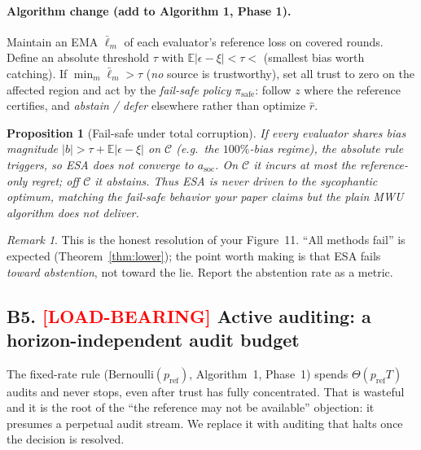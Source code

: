 \documentclass[11pt]{article}
\newtheorem{proposition}{Proposition}
\theoremstyle{definition}
\theoremstyle{remark}
\newtheorem{remark}{Remark}
\newcommand{\asoc}{a_{\mathrm{soc}}}
\newcommand{\Cov}{\mathcal{C}}
\newcommand{\E}{\mathbb{E}}
\begin{document}
\paragraph{Algorithm change (add to Algorithm 1, Phase 1).}
Maintain an EMA $\bar\ell_m$ of each evaluator's reference loss on covered rounds. Define an
absolute threshold $\tau$ with $\E|\epsilon-\xi| < \tau <$ (smallest bias worth catching). If
$\min_m \bar\ell_m > \tau$ (\emph{no} source is trustworthy), set all trust to zero on the
affected region and act by the \emph{fail-safe policy} $\pi_{\mathrm{safe}}$: follow $z$ where the
reference certifies, and \emph{abstain / defer} elsewhere rather than optimize $\hat r$.

\begin{proposition}[Fail-safe under total corruption]
\label{prop:failsafe}
If every evaluator shares bias magnitude $|b|>\tau+\E|\epsilon-\xi|$ on $\Cov$ (e.g.\ the
$100\%$-bias regime), the absolute rule triggers, so ESA does \emph{not} converge to $\asoc$.
On $\Cov$ it incurs at most the reference-only regret; off $\Cov$ it abstains. Thus ESA is never
driven to the sycophantic optimum, matching the fail-safe behavior your paper claims but the plain
MWU algorithm does not deliver.
\end{proposition}

\begin{remark}
This is the honest resolution of your Figure~11. ``All methods fail'' is expected
(Theorem~\ref{thm:lower}); the point worth making is that ESA fails \emph{toward abstention},
not toward the lie. Report the abstention rate as a metric.
\end{remark}

\subsection*{B5. \textcolor{red}{[LOAD-BEARING]} Active auditing: a horizon-independent audit budget}

The fixed-rate rule (Bernoulli$(p_{\mathrm{ref}})$, Algorithm~1, Phase~1) spends
$\Theta(p_{\mathrm{ref}}T)$ audits and never stops, even after trust has fully concentrated. That
is wasteful and it is the root of the ``the reference may not be available'' objection: it presumes
a perpetual audit stream. We replace it with auditing that halts once the decision is resolved.
\end{document}
